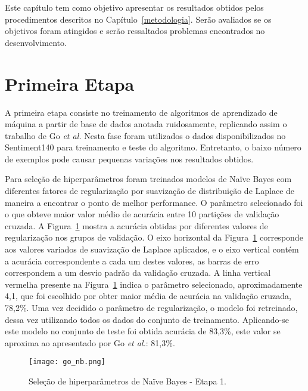 Este capítulo tem como objetivo apresentar os resultados obtidos pelos procedimentos descritos no
Capítulo~\ref{metodologia}.
Serão avaliados se os objetivos foram atingidos e serão ressaltados problemas encontrados no desenvolvimento.

\section{Primeira Etapa}

A primeira etapa consiste no treinamento de algoritmos de aprendizado de máquina a partir de base de dados anotada
ruidosamente, replicando assim o trabalho de Go \textit{et al.}
Nesta fase foram utilizados o dados disponibilizados no Sentiment140 para treinamento e teste do algoritmo.
Entretanto, o baixo número de exemplos pode causar pequenas variações nos resultados obtidos.

Para seleção de hiperparâmetros foram treinados modelos de Naïve Bayes com diferentes fatores de regularização por
suavização de distribuição de Laplace de maneira a encontrar o ponto de melhor performance.
O parâmetro selecionado foi o que obteve maior valor médio de acurácia entre 10 partições de validação cruzada.
A Figura~\ref{fig:go_nb} mostra a acurácia obtidas por diferentes valores de regularização nos grupos de validação.
O eixo horizontal da Figura~\ref{fig:go_nb} corresponde aos valores variados de suavização de Laplace aplicados, e o
eixo vertical contém a acurácia correspondente a cada um destes valores, as barras de erro correspondem a um desvio
padrão da validação cruzada.
A linha vertical vermelha presente na Figura~\ref{fig:go_nb} indica o parâmetro selecionado, aproximadamente 4,1, que
foi escolhido por obter maior média de acurácia na validação cruzada, 78,2\%.
Uma vez decidido o parâmetro de regularização, o modelo foi retreinado, dessa vez utilizando todos os dados do conjunto
de treinamento.
Aplicando-se este modelo no conjunto de teste foi obtida acurácia de 83,3\%, este valor se aproxima ao apresentado por Go
\textit{et al.}: 81,3\%.

\begin{figure}
\begin{center} {
    \begin{center}
    \texttt{[image: go\_nb.png]}
    \caption{Seleção de hiperparâmetros de Naïve Bayes - Etapa 1.}
    \label{fig:go_nb}
    \end{center}
}
\end{center}
\end{figure}

